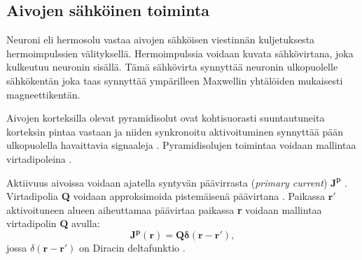 \subsection{Aivojen sähköinen toiminta}
Neuroni eli hermosolu vastaa aivojen sähköisen viestinnän kuljetuksesta hermoimpulssien välityksellä. Hermoimpulssia voidaan kuvata sähkövirtana, joka kulkeutuu neuronin sisällä. Tämä sähkövirta synnyttää neuronin ulkopuolelle sähkökentän joka taas synnyttää ympärilleen Maxwellin yhtälöiden mukaisesti magneettikentän. 

Aivojen korteksilla olevat pyramidisolut ovat kohtisuorasti suuntautuneita korteksin pintaa vastaan ja niiden synkronoitu aktivoituminen synnyttää pään ulkopuolella havaittavia signaaleja \citep{He2018ElectrophysiologicalDynamics}. Pyramidisolujen toimintaa voidaan mallintaa virtadipoleina \citep[s. 10]{HariMEGprimer}. 

Aktiivuus aivoissa voidaan ajatella syntyvän päävirrasta (\textit{primary current}) $\mathbf{J^p}$ \citep{Baillet2001ElectromagneticMapping}. Virtadipolia \textbf{Q} voidaan approksimoida pistemäisenä päävirtana \citep{Hamalainen1993MagnetoencephalographytheoryBrain}. Paikassa $\mathbf{r'}$ aktivoituneen alueen aiheuttamaa päävirtaa paikassa \textbf{r} voidaan mallintaa virtadipolin \textbf{Q} avulla:
\begin{equation}
    \mathbf{J^p(r) = Q\delta (r-r')},
\end{equation}
jossa $\delta (\mathbf{r-r'})$ on Diracin deltafunktio \citep{Baillet2001ElectromagneticMapping}. 

